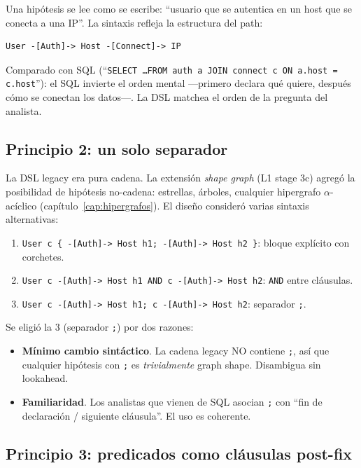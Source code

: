 Una hipótesis se lee como se escribe: ``usuario que se autentica
en un host que se conecta a una IP''. La sintaxis refleja la
estructura del path:

\begin{lstlisting}
User -[Auth]-> Host -[Connect]-> IP
\end{lstlisting}

\noindent
Comparado con SQL (``\texttt{SELECT \dots FROM auth a JOIN connect c
ON a.host = c.host}''): el SQL invierte el orden mental ---primero
declara qué quiere, después cómo se conectan los datos---. La DSL
matchea el orden de la pregunta del analista.

\subsection{Principio 2: un solo separador}

La DSL legacy era pura cadena. La extensión \emph{shape graph} (L1
stage 3c) agregó la posibilidad de hipótesis no-cadena: estrellas,
árboles, cualquier hipergrafo \(\alpha\)-acíclico
(capítulo~\ref{cap:hipergrafos}). El diseño consideró varias
sintaxis alternativas:

\begin{enumerate}
    \item \texttt{User c \{ -[Auth]-> Host h1; -[Auth]-> Host h2 \}}:
    bloque explícito con corchetes.
    \item \texttt{User c -[Auth]-> Host h1 AND c -[Auth]-> Host h2}:
    \texttt{AND} entre cláusulas.
    \item \texttt{User c -[Auth]-> Host h1; c -[Auth]-> Host h2}:
    separador \texttt{;}.
\end{enumerate}

\noindent
Se eligió la 3 (separador \texttt{;}) por dos razones:

\begin{itemize}
    \item \textbf{Mínimo cambio sintáctico}. La cadena legacy NO
    contiene \texttt{;}, así que cualquier hipótesis con \texttt{;}
    es \emph{trivialmente} graph shape. Disambigua sin lookahead.
    \item \textbf{Familiaridad}. Los analistas que vienen de SQL
    asocian \texttt{;} con ``fin de declaración / siguiente
    cláusula''. El uso es coherente.
\end{itemize}

\subsection{Principio 3: predicados como cláusulas post-fix}

